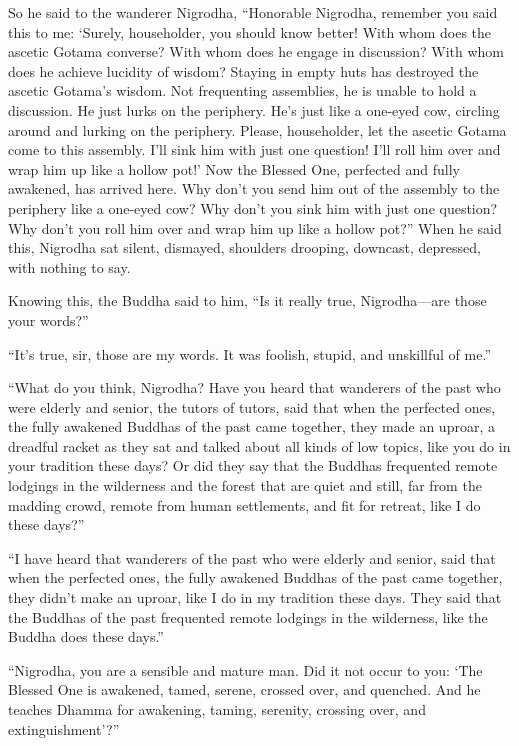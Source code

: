 \documentclass[12pt,openany]{book}%
\begin{document}
So he said to the wanderer Nigrodha, “Honorable Nigrodha, remember you said this to me: ‘Surely, householder, you should know better! With whom does the ascetic Gotama converse? With whom does he engage in discussion? With whom does he achieve lucidity of wisdom? Staying in empty huts has destroyed the ascetic Gotama’s wisdom. Not frequenting assemblies, he is unable to hold a discussion. He just lurks on the periphery. He’s just like a one-eyed cow, circling around and lurking on the periphery. Please, householder, let the ascetic Gotama come to this assembly. I’ll sink him with just one question! I’ll roll him over and wrap him up like a hollow pot!’ Now the Blessed One, perfected and fully awakened, has arrived here. Why don’t you send him out of the assembly to the periphery like a one-eyed cow? Why don’t you sink him with just one question? Why don’t you roll him over and wrap him up like a hollow pot?” When he said this, Nigrodha sat silent, dismayed, shoulders drooping, downcast, depressed, with nothing to say. 

Knowing this, the Buddha said to him, “Is it really true, Nigrodha—are those your words?” 

“It’s true, sir, those are my words. It was foolish, stupid, and unskillful of me.” 

“What do you think, Nigrodha? Have you heard that wanderers of the past who were elderly and senior, the tutors of tutors, said that when the perfected ones, the fully awakened Buddhas of the past came together, they made an uproar, a dreadful racket as they sat and talked about all kinds of low topics, like you do in your tradition these days? Or did they say that the Buddhas frequented remote lodgings in the wilderness and the forest that are quiet and still, far from the madding crowd, remote from human settlements, and fit for retreat, like I do these days?” 

“I have heard that wanderers of the past who were elderly and senior, said that when the perfected ones, the fully awakened Buddhas of the past came together, they didn’t make an uproar, like I do in my tradition these days. They said that the Buddhas of the past frequented remote lodgings in the wilderness, like the Buddha does these days.” 

“Nigrodha, you are a sensible and mature man. Did it not occur to you: ‘The Blessed One is awakened, tamed, serene, crossed over, and quenched. And he teaches Dhamma for awakening, taming, serenity, crossing over, and extinguishment’?” 
\end{document}
